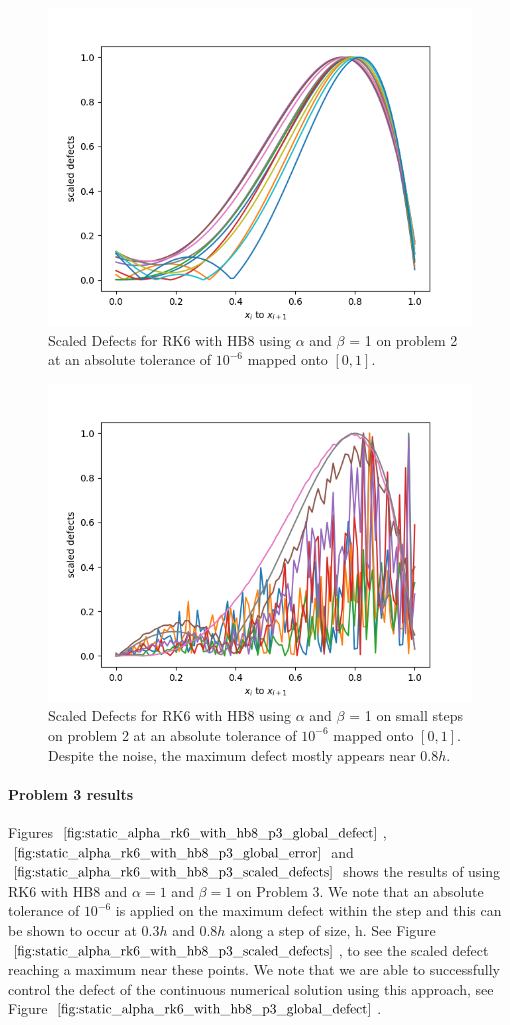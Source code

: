 \begin{figure}[H]
\centering
\includegraphics[width=0.7\linewidth]{./figures/static_alpha_rk6_with_hb8_p2_scaled_defects}
\caption{Scaled Defects for RK6 with HB8 using $\alpha$ and $\beta$ = 1 on problem 2 at an absolute tolerance of $10^{-6}$ mapped onto $[0, 1]$.}
\label{fig:static_alpha_rk6_with_hb8_p2_scaled_defects}
\end{figure}

\begin{figure}[H]
\centering
\includegraphics[width=0.7\linewidth]{./figures/static_alpha_rk6_with_hb8_p2_scaled_defects_small_steps}
\caption{Scaled Defects for RK6 with HB8 using $\alpha$ and $\beta$ = 1 on small steps on problem 2 at an absolute tolerance of $10^{-6}$ mapped onto $[0, 1]$. Despite the noise, the maximum defect mostly appears near $0.8h$.}
\label{fig:static_alpha_rk6_with_hb8_p2_scaled_defects_small_steps}
\end{figure}

\paragraph{Problem 3 results}
Figures $\ref{fig:static_alpha_rk6_with_hb8_p3_global_defect}$, $\ref{fig:static_alpha_rk6_with_hb8_p3_global_error}$ and $\ref{fig:static_alpha_rk6_with_hb8_p3_scaled_defects}$ shows the results of using RK6 with HB8 and $\alpha = 1$ and $\beta = 1$ on Problem 3. We note that an absolute tolerance of $10^{-6}$ is applied on the maximum defect within the step and this can be shown to occur at $0.3h$ and $0.8h$ along a step of size, h. See Figure $\ref{fig:static_alpha_rk6_with_hb8_p3_scaled_defects}$, to see the scaled defect reaching a maximum near these points. We note that we are able to successfully control the defect of the continuous numerical solution using this approach, see Figure $\ref{fig:static_alpha_rk6_with_hb8_p3_global_defect}$. 

